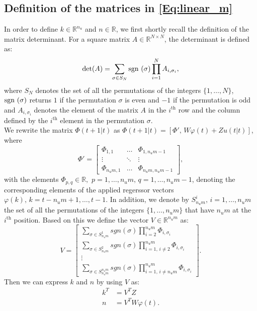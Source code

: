 \documentclass[10 pt, letterpaper]{article}
\newcommand{\sgn}{\mbox {\rm sgn }}
\newcommand{\beq}{\begin{equation}}
\newcommand{\eeq}{\end{equation}}
\newcommand{\ba}{\begin{array}}
\newcommand{\ea}{\end{array}}
\newcommand{\bR}{{\mathbb R}}
\begin{document}
\subsection{Definition of the matrices in \eqref{Eq:linear_m}}\label{S:alpha_beta}
In order to define $k \in \bR^{n_u}$ and $n \in \bR$, we first shortly recall the definition of the matrix determinant. For a square matrix $A\in \bR^{N\times N}$, the determinant is defined as:
\beq\label{Eq:det_def}
\det (A)=\sum \limits_{\sigma \in S_N}\sgn(\sigma) \prod \limits_{i=1}^N A_{i,\sigma_i}, 
\eeq 
where $S_N$ denotes the set of all the permutations of the integers $\{1,\hdots,N\}$, $\sgn (\sigma)$ returns $1$ if the permutation $\sigma$ is even and $-1$ if the permutation is odd and $A_{i,\sigma_i}$ denotes the element of the matrix $A$ in the $i^{\text{th}}$ row and the column defined by the $i^{\text{th}}$ element in the permutation $\sigma$.\\
We rewrite the matrix $\Phi(t+1|t)$ as $\Phi(t+1|t)=\left[\Phi',\, W\varphi(t)+Zu(t|t)\right]$, where
\begin{equation*}
\Phi'=\left[ \ba{ccc}  \Phi_{1,1} &\hdots & \Phi_{1,n_um-1}\\ \vdots & \ddots & \vdots\\ \Phi_{n_um,1}& \hdots & \Phi_{n_um,n_um-1} \ea \right],
\end{equation*}
with the elements $\Phi_{p,q}\in \bR,\,\, p=1,\hdots,n_um,\, q=1,\hdots,n_um-1$, denoting the corresponding elements of the applied regerssor vectors $\varphi(k),\, k=t-n_um+1,\hdots, t-1$. In addition, we denote by $S_{n_um}^i,\, i=1,\hdots, n_um$ the set of all the permutations of the integers $\{1,\hdots,n_um\}$ that have $n_um$ at the $i^{\text{th}}$ position. Based on this we define the vector $V \in \bR^{n_um}$ as:
\beq\label{Eq:medjurezultat2}
V=\left[ \ba{c}  \sum \limits_{\sigma \in S_{n_um}^1} sgn(\sigma) \prod\limits_{i=2}^{n_um}\Phi_{i,\sigma_i}\\ \sum \limits_{\sigma \in S_{n_um}^2} sgn(\sigma) \prod\limits_{i=1,\,i\neq 2}^{n_um}\Phi_{i,\sigma_i}\\ \vdots \\\sum \limits_{\sigma \in S_{n_um}^{n_um}} sgn(\sigma) \prod\limits_{ i=1,\, i\neq n_um}^{n_um}\Phi_{i,\sigma_i}\ea \right].
\eeq
Then we can express $k$ and $n$ by using $V$ as:
\beq\label{Eq:alpha_beta_def}
\begin{aligned}
k^T&=V^TZ\\
n&=V^TW\varphi(t).
\end{aligned}
\eeq
\end{document}
